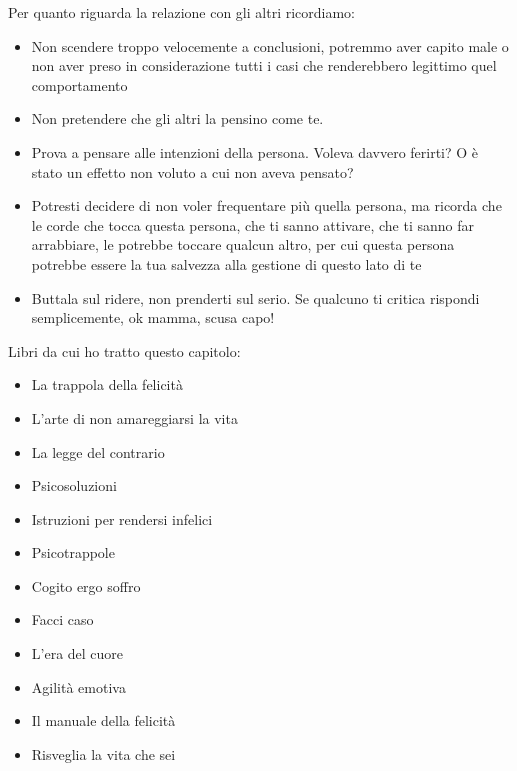 \documentclass[12pt]{book} %
\begin{document}
Per quanto riguarda la relazione con gli altri ricordiamo:
\begin{itemize}
\item Non scendere troppo velocemente a conclusioni, potremmo aver capito male o non aver preso in considerazione tutti
i casi che renderebbero legittimo quel comportamento
\item Non pretendere che gli altri la pensino come te.
\item Prova a pensare alle intenzioni della persona. Voleva davvero ferirti? O è stato un effetto non voluto a cui non
aveva pensato?
\item Potresti decidere di non voler frequentare più quella persona, ma ricorda che le corde che tocca questa persona,
che ti sanno attivare, che ti sanno far arrabbiare, le potrebbe toccare qualcun altro, per cui questa persona potrebbe
essere la tua salvezza alla gestione di questo lato di te
\item Buttala sul ridere, non prenderti sul serio. Se qualcuno ti critica rispondi semplicemente, ok mamma, scusa capo!
\end{itemize}

Libri da cui ho tratto questo capitolo:

\begin{itemize}
\item La trappola della felicità
\item L'arte di non amareggiarsi la vita
\item La legge del contrario
\item Psicosoluzioni 
\item Istruzioni per rendersi infelici
\item Psicotrappole
\item Cogito ergo soffro
\item Facci caso
\item L'era del cuore
\item Agilità emotiva
\item Il manuale della felicità
\item Risveglia la vita che sei
\end{itemize}
\end{document}
